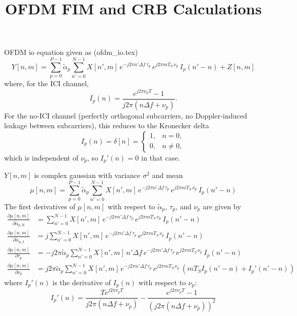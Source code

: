 \documentclass[11pt]{article}
\title{OFDM FIM and CRB Calculations}
\author{}
\date{}
\begin{document}
\maketitle
OFDM io equation given as (ofdm\_io.tex)
\begin{equation}
    Y[n,m]
= \sum_{p=0}^{P-1} \tilde{\alpha}_p
  \sum_{n'=0}^{N-1} X[n',m]\,
  e^{-j2\pi n'\Delta f\, \tau_p}\,
  e^{j2\pi mT_S\, \nu_p}\,
  I_p(n'-n) + Z[n,m]
\end{equation}
where, for the ICI channel,
\begin{equation}
    I_p(n)
 = \frac{e^{j2\pi \nu_p T} - 1}{j2\pi(n\Delta f + \nu_p)}.
\end{equation}
For the no-ICI channel (perfectly orthogonal subcarriers, no Doppler-induced leakage between subcarriers), this reduces to the Kronecker delta
\begin{equation}
    I_p(n) = \delta[n] = \begin{cases} 1, & n = 0, \\ 0, & n \neq 0, \end{cases}
\end{equation}
which is independent of \(\nu_p\), so \(I_p'(n) = 0\) in that case.

\(Y[n,m]\) is complex gaussian with variance \(\sigma^2\) and mean
\begin{equation}
    \mu[n,m]
= \sum_{p=0}^{P-1} \tilde{\alpha}_p
  \sum_{n'=0}^{N-1} X[n',m]\,
  e^{-j2\pi n'\Delta f\, \tau_p}\,
  e^{j2\pi mT_S\, \nu_p}\,
  I_p(n'-n)
\end{equation}
The first derivatives of \(\mu[n,m]\) with respect to \(\tilde{\alpha}_p\), \(\tau_p\), and \(\nu_p\) are given by
\begin{align}
    \frac{\partial \mu[n,m]}{\partial \tilde{\alpha}_{p,R}} &= \sum_{n'=0}^{N-1} X[n',m]\, e^{-j2\pi n'\Delta f\, \tau_p}\, e^{j2\pi mT_S\, \nu_p}\, I_p(n'-n) \\
    \frac{\partial \mu[n,m]}{\partial \tilde{\alpha}_{p,I}} &= j\sum_{n'=0}^{N-1} X[n',m]\, e^{-j2\pi n'\Delta f\, \tau_p}\, e^{j2\pi mT_S\, \nu_p}\, I_p(n'-n) \\
    \frac{\partial \mu[n,m]}{\partial \tau_p} &= -j2\pi \tilde{\alpha}_p \sum_{n'=0}^{N-1} X[n',m]\, n'\Delta f\, e^{-j2\pi n'\Delta f\, \tau_p}\, e^{j2\pi mT_S\, \nu_p}\, I_p(n'-n) \\
    \frac{\partial \mu[n,m]}{\partial \nu_p} &= j2\pi \tilde{\alpha}_p \sum_{n'=0}^{N-1} X[n',m]\, e^{-j2\pi n'\Delta f\, \tau_p}\, e^{j2\pi mT_S\, \nu_p}\, \left( mT_S I_p(n'-n) + I_p'(n'-n) \right)
\end{align}
where \(I_p'(n)\) is the derivative of \(I_p(n)\) with respect to \(\nu_p\):
\begin{equation}    
    I_p'(n) = \frac{T e^{j2\pi \nu_p T}}{j2\pi(n\Delta f + \nu_p)} - \frac{e^{j2\pi \nu_p T} - 1}{(j2\pi(n\Delta f + \nu_p))^2}
\end{equation}
\end{document}
